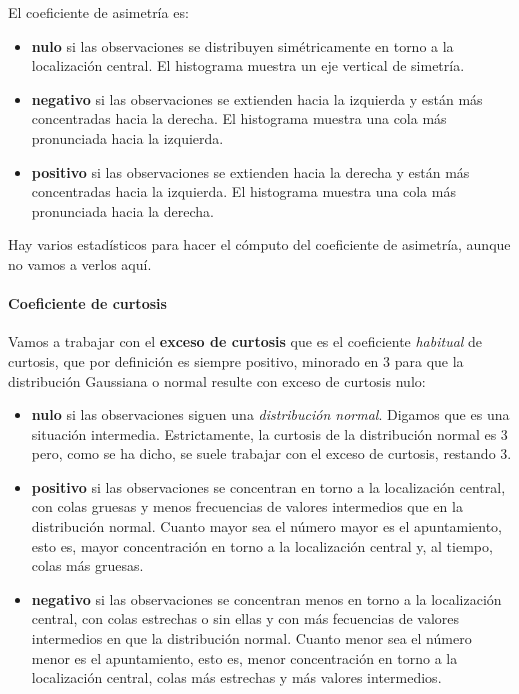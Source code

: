 \documentclass[11pt]{article}
\providecommand{\tightlist}{%
      \setlength{\itemsep}{0pt}\setlength{\parskip}{0pt}}
\begin{document}
El coeficiente de asimetría es:

\begin{itemize}
\tightlist
\item
  \textbf{nulo} si las observaciones se distribuyen simétricamente en
  torno a la localización central. El histograma muestra un eje vertical
  de simetría.
\item
  \textbf{negativo} si las observaciones se extienden hacia la izquierda
  y están más concentradas hacia la derecha. El histograma muestra una
  cola más pronunciada hacia la izquierda.
\item
  \textbf{positivo} si las observaciones se extienden hacia la derecha y
  están más concentradas hacia la izquierda. El histograma muestra una
  cola más pronunciada hacia la derecha.
\end{itemize}

Hay varios estadísticos para hacer el cómputo del coeficiente de
asimetría, aunque no vamos a verlos aquí.

    \paragraph{Coeficiente de curtosis}\label{coeficiente-de-curtosis}

Vamos a trabajar con el \textbf{exceso de curtosis} que es el
coeficiente \emph{habitual} de curtosis, que por definición es siempre
positivo, minorado en 3 para que la distribución Gaussiana o normal
resulte con exceso de curtosis nulo:

\begin{itemize}
\tightlist
\item
  \textbf{nulo} si las observaciones siguen una \emph{distribución
  normal}. Digamos que es una situación intermedia. Estrictamente, la
  curtosis de la distribución normal es 3 pero, como se ha dicho, se
  suele trabajar con el exceso de curtosis, restando 3.
\item
  \textbf{positivo} si las observaciones se concentran en torno a la
  localización central, con colas gruesas y menos frecuencias de valores
  intermedios que en la distribución normal. Cuanto mayor sea el número
  mayor es el apuntamiento, esto es, mayor concentración en torno a la
  localización central y, al tiempo, colas más gruesas.
\item
  \textbf{negativo} si las observaciones se concentran menos en torno a
  la localización central, con colas estrechas o sin ellas y con más
  fecuencias de valores intermedios en que la distribución normal.
  Cuanto menor sea el número menor es el apuntamiento, esto es, menor
  concentración en torno a la localización central, colas más estrechas
  y más valores intermedios.
\end{itemize}
\end{document}
